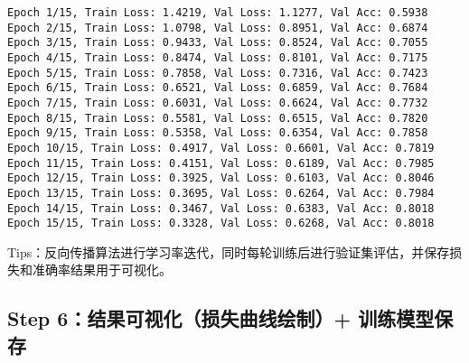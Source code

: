 \documentclass[11pt]{article}
\begin{document}
    \begin{Verbatim}[commandchars=\\\{\}]
Epoch 1/15, Train Loss: 1.4219, Val Loss: 1.1277, Val Acc: 0.5938
Epoch 2/15, Train Loss: 1.0798, Val Loss: 0.8951, Val Acc: 0.6874
Epoch 3/15, Train Loss: 0.9433, Val Loss: 0.8524, Val Acc: 0.7055
Epoch 4/15, Train Loss: 0.8474, Val Loss: 0.8101, Val Acc: 0.7175
Epoch 5/15, Train Loss: 0.7858, Val Loss: 0.7316, Val Acc: 0.7423
Epoch 6/15, Train Loss: 0.6521, Val Loss: 0.6859, Val Acc: 0.7684
Epoch 7/15, Train Loss: 0.6031, Val Loss: 0.6624, Val Acc: 0.7732
Epoch 8/15, Train Loss: 0.5581, Val Loss: 0.6515, Val Acc: 0.7820
Epoch 9/15, Train Loss: 0.5358, Val Loss: 0.6354, Val Acc: 0.7858
Epoch 10/15, Train Loss: 0.4917, Val Loss: 0.6601, Val Acc: 0.7819
Epoch 11/15, Train Loss: 0.4151, Val Loss: 0.6189, Val Acc: 0.7985
Epoch 12/15, Train Loss: 0.3925, Val Loss: 0.6103, Val Acc: 0.8046
Epoch 13/15, Train Loss: 0.3695, Val Loss: 0.6264, Val Acc: 0.7984
Epoch 14/15, Train Loss: 0.3467, Val Loss: 0.6383, Val Acc: 0.8018
Epoch 15/15, Train Loss: 0.3328, Val Loss: 0.6268, Val Acc: 0.8018
    \end{Verbatim}

    Tips：反向传播算法进行学习率迭代，同时每轮训练后进行验证集评估，并保存损失和准确率结果用于可视化。

    \hypertarget{step-6ux7ed3ux679cux53efux89c6ux5316ux635fux5931ux66f2ux7ebfux7ed8ux5236-ux8badux7ec3ux6a21ux578bux4fddux5b58}{%
\subsection{Step 6：结果可视化（损失曲线绘制）+
训练模型保存}\label{step-6ux7ed3ux679cux53efux89c6ux5316ux635fux5931ux66f2ux7ebfux7ed8ux5236-ux8badux7ec3ux6a21ux578bux4fddux5b58}}
\end{document}

